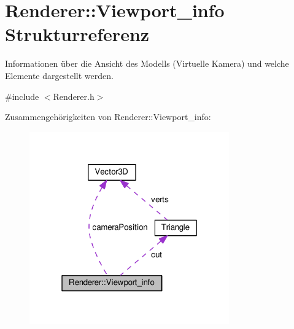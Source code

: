 \hypertarget{structRenderer_1_1Viewport__info}{\section{Renderer\-:\-:Viewport\-\_\-info Strukturreferenz}
\label{structRenderer_1_1Viewport__info}
}


Informationen über die Ansicht des Modells (Virtuelle Kamera) und welche Elemente dargestellt werden.  




{\ttfamily \#include $<$Renderer.\-h$>$}



Zusammengehörigkeiten von Renderer\-:\-:Viewport\-\_\-info\-:
\nopagebreak
\begin{figure}[H]
\begin{center}
\leavevmode
\includegraphics[width=244pt]{structRenderer_1_1Viewport__info__coll__graph}
\end{center}
\end{figure}
